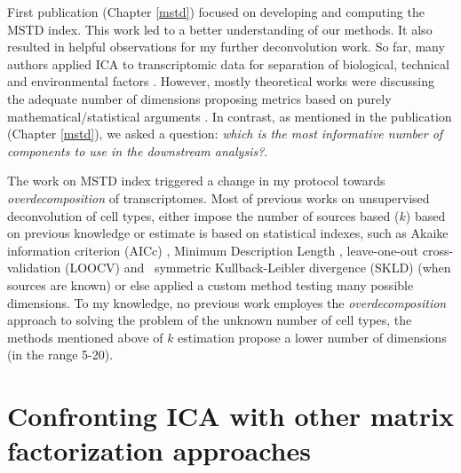 \documentclass[12pt,]{book}
\theoremstyle{definition}
\theoremstyle{definition}
\theoremstyle{definition}
\theoremstyle{remark}
\begin{document}
First publication (Chapter \ref{mstd}) focused on developing and
computing the MSTD index. This work led to a better understanding of our
methods. It also resulted in helpful observations for my further
deconvolution work. So far, many authors applied ICA to transcriptomic
data for separation of biological, technical and environmental factors
\citep{Teschendorff2007, Biton2014, Gorban2007, Zinovyev2013}. However,
mostly theoretical works were discussing the adequate number of
dimensions proposing metrics based on purely mathematical/statistical
arguments \citep{Cangelosi2007, Kegl2003, Bro2008}. In contrast, as
mentioned in the publication (Chapter \ref{mstd})\citep{Kairov2017}, we
asked a question: \emph{which is the most informative number of
components to use in the downstream analysis?}.

The work on MSTD index triggered a change in my protocol towards
\emph{overdecomposition} of transcriptomes. Most of previous works on
unsupervised deconvolution of cell types, either impose the number of
sources based (\(k\)) based on previous knowledge
\citep{Repsilber2010, Ogundijo2017, Newberg2018} or estimate is based on
statistical indexes, such as Akaike information criterion (AICc)
\citep[proposed initially by][applied to estimation of number of cell
types by \citet{Liebner2014}]{Hurvich1989}, Minimum Description Length
\citep[proposed initially by][applied in CAM model by
\citet{Wang2016}]{Wax1985}, leave-one-out cross-validation (LOOCV)
\citep{Lahdesmaki2005} and ~symmetric Kullback-Leibler divergence (SKLD)
\citep{Zuckerman2013} (when sources are known) or else
\citet{Moffitt2015} applied a custom method testing many possible
dimensions. To my knowledge, no previous work employes the
\emph{overdecomposition} approach to solving the problem of the unknown
number of cell types, the methods mentioned above of \(k\) estimation
propose a lower number of dimensions (in the range 5-20).

\hypertarget{confronting-ica-with-other-matrix-factorization-approaches}{%
\section{Confronting ICA with other matrix factorization
approaches}\label{confronting-ica-with-other-matrix-factorization-approaches}}
\end{document}
